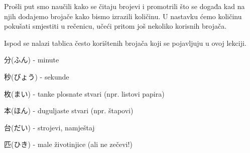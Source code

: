 
\usepackage{xcolor}
\author{Tomislav Mamić}

	
	Prošli put smo naučili kako se čitaju brojevi i promotrili što se događa kad na njih dodajemo brojače kako bismo izrazili količinu. U nastavku ćemo količinu pokušati smjestiti u rečenicu, učeći pritom još nekoliko korisnih brojača.
	
	
	Ispod se nalazi tablica često korištenih brojača koji se pojavljuju u ovoj lekciji.
	
	\begin{hyou}
		\item 分(ふん) - minute
		\item 秒(びょう) - sekunde
		\item 枚(まい) - tanke plosnate stvari (npr. listovi papira)
		\item 本(ほん) - duguljaste stvari (npr. štapovi)
		\item 台(だい) - strojevi, namještaj
		\item 匹(ひき) - male životinjice (ali ne zečevi!)
	\end{hyou}

